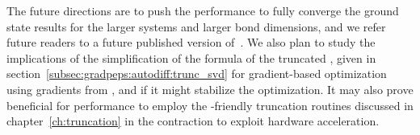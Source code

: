 The future directions are to push the performance to fully converge the ground state results for the larger systems and larger bond dimensions, and we refer future readers to a future published version of~\cite{unfried2024}.
%
We also plan to study the implications of the simplification of the  formula of the truncated , given in section~\ref{subsec:gradpeps:autodiff:trunc_svd} for gradient-based optimization using gradients from , and if it might stabilize the optimization.
%
It may also prove beneficial for performance to employ the -friendly truncation routines discussed in chapter~\ref{ch:truncation} in the  contraction to exploit hardware acceleration.
